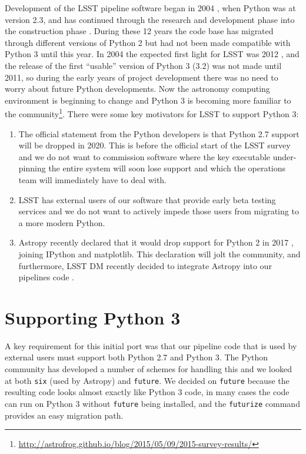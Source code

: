 \documentclass[11pt,twoside]{article}
\begin{document}
Development of the LSST pipeline software began in 2004 \citep{2004AAS...20510811A}, when Python was at version 2.3, and has continued through the research and development phase \citep{2010SPIE.7740E..15A} into the construction phase \citep{P056_adassxxv}.
During these 12 years the code base has migrated through different versions of Python 2 but had not been made compatible with Python 3 until this year.
In 2004 the expected first light for LSST was 2012 \citep{2004SPIE.5489..705C}, and the release of the first ``usable'' version of Python 3 (3.2) was not made until 2011, so during the early years of project development there was no need to worry about future Python developments.
Now the astronomy computing environment is beginning to change and Python 3 is becoming more familiar to the community\footnote{\url{http://astrofrog.github.io/blog/2015/05/09/2015-survey-results/}}.
There were some key motivators for LSST to support Python 3:
\begin{enumerate}
    \item The official statement from the Python developers is that Python 2.7 support will be dropped in 2020.
    This is before the official start of the LSST survey and we do not want to commission software where the key executable under-pinning the entire system will soon lose support and which the operations team will immediately have to deal with.
    \item LSST has external users of our software that provide early beta testing services and we do not want to actively impede those users from migrating to a more modern Python.
    \item Astropy \citep{2013A&A...558A..33A} recently declared that it would drop support for Python 2 in 2017 \citep{APE10}, joining IPython and matplotlib. This declaration will jolt the community, and furthermore, LSST DM recently decided to integrate Astropy into our pipelines code \citep{doi:10.1117/12.2231313}.
\end{enumerate}


\section{Supporting Python 3}

A key requirement for this initial port was that our pipeline code that is used by external users must support both Python 2.7 and Python 3.
The Python community has developed a number of schemes for handling this and we looked at both \texttt{six} (used by Astropy) and \texttt{future}.
We decided on \texttt{future} because the resulting code looks almost exactly like Python 3 code, in many cases the code can run on Python 3 without \texttt{future} being installed, and the \texttt{futurize} command provides an easy migration path.
\end{document}
